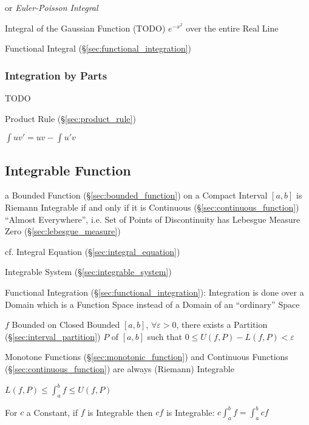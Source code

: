 or \emph{Euler-Poisson Integral}

Integral of the Gaussian Function (TODO) $e^{-x^2}$ over the entire Real Line

\fist Functional Integral (\S\ref{sec:functional_integration})



\subsubsection{Integration by Parts}\label{sec:integration_by_parts}

TODO

\fist Product Rule (\S\ref{sec:product_rule})

$\int{uv'} = uv - \int{u'v}$



\subsection{Integrable Function}\label{sec:integrable_function}


a Bounded Function (\S\ref{sec:bounded_function}) on a Compact Interval $[a,b]$
is Riemann Integrable if and only if it is Continuous
(\S\ref{sec:continuous_function}) ``Almost Everywhere'', i.e. Set of Points of
Discontinuity has Lebesgue Measure Zero (\S\ref{sec:lebesgue_measure})

cf. Integral Equation (\S\ref{sec:integral_equation})

\fist Integrable System (\S\ref{sec:integrable_system})

\fist Functional Integration (\S\ref{sec:functional_integration}): Integration
is done over a Domain which is a Function Space instead of a Domain of an
``ordinary'' Space

$f$ Bounded on Closed Bounded $[a,b]$, $\forall \varepsilon >0$, there
exists a Partition (\S\ref{sec:interval_partition}) $P$ of $[a,b]$
such that $0 \leq U(f,P) - L(f,P) < \varepsilon$ %

Monotone Functions (\S\ref{sec:monotonic_function}) and Continuous
Functions (\S\ref{sec:continuous_function}) are always (Riemann)
Integrable

$L(f,P) \leq \int_a^b f \leq U(f,P)$

For $c$ a Constant, if $f$ is Integrable then $cf$ is Integrable: $c
\int_a^b f = \int_a^b c f$

